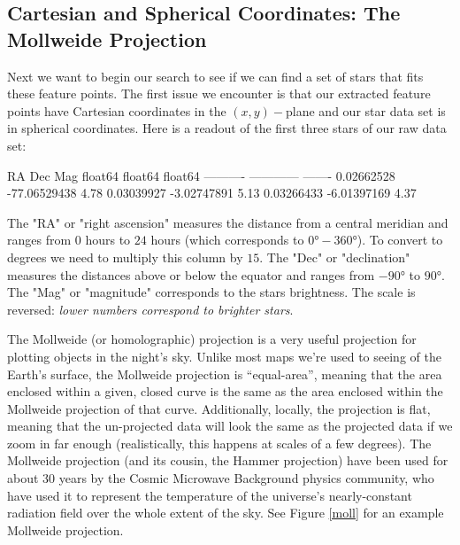 \documentclass[paper=a4, fontsize=11pt]{scrartcl} %
\begin{document}
\subsection{Cartesian and Spherical Coordinates: The Mollweide Projection}
Next we want to begin our search to see if we can find a set of stars that fits these feature points. The first issue we encounter is that our extracted feature points have Cartesian coordinates in the $(x,y)-$plane and our star data set is in spherical coordinates. Here is a readout of the first three stars of our raw data set:
\begin{python}
	   RA         Dec        Mag  
	float64     float64    float64
	---------- ------------ -------
	0.02662528 -77.06529438    4.78
	0.03039927  -3.02747891    5.13
	0.03266433  -6.01397169    4.37
\end{python}
The "RA" or "right ascension" measures the distance from a central meridian and ranges from $0$ hours to $24$ hours (which corresponds to $0\si{\degree}-360\si{\degree}$). To convert to degrees we need to multiply this column by $15$.
The "Dec" or "declination" measures the distances above or below the equator and ranges from $-90\si{\degree}$ to $90\si{\degree}$. The "Mag" or "magnitude" corresponds to the stars brightness. The scale is reversed: \textit{lower numbers correspond to brighter stars}.

The Mollweide (or homolographic) projection is a very useful projection for plotting objects in the night’s sky. Unlike most maps we’re used to seeing of the Earth’s surface, the Mollweide projection is ``equal-area”, meaning that the area enclosed within a given, closed curve is the same as the area enclosed within the Mollweide projection of that curve. Additionally, locally, the projection is flat, meaning that the un-projected data will look the same as the projected data if we zoom in far enough (realistically, this happens at scales of a few degrees). The Mollweide projection (and its cousin, the Hammer projection) have been used for about 30 years by the Cosmic Microwave Background physics community, who have used it to represent the temperature of the universe’s nearly-constant radiation field over the whole extent of the sky.  See Figure \ref{moll} for an example Mollweide projection.
\end{document}

